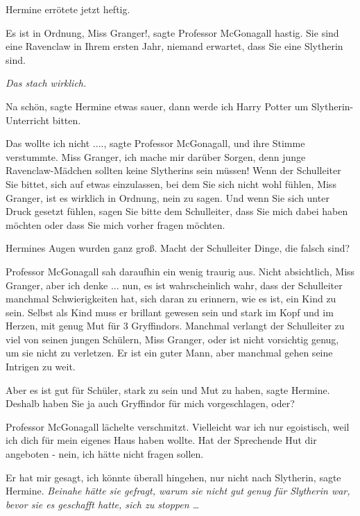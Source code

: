Hermine errötete jetzt heftig.

\glqq{}Es ist in Ordnung, Miss Granger!\grqq{}, sagte Professor McGonagall
hastig. \glqq{}Sie sind eine Ravenclaw in Ihrem ersten Jahr, niemand erwartet,
dass Sie eine Slytherin sind.\grqq{}

\emph{Das stach wirklich.}

\glqq{}Na schön\grqq{}, sagte Hermine etwas sauer, \glqq{}dann werde ich Harry
Potter um Slytherin-Unterricht bitten.\grqq{}

\glqq{}Das wollte ich nicht ....\grqq{}, sagte Professor McGonagall, und ihre
Stimme verstummte. \glqq{}Miss Granger, ich mache mir darüber Sorgen, denn junge
Ravenclaw-Mädchen sollten keine Slytherins sein müssen! Wenn der Schulleiter Sie
bittet, sich auf etwas einzulassen, bei dem Sie sich nicht wohl fühlen, Miss
Granger, ist es wirklich in Ordnung, nein zu sagen. Und wenn Sie sich unter
Druck gesetzt fühlen, sagen Sie bitte dem Schulleiter, dass Sie mich dabei haben
möchten oder dass Sie mich vorher fragen möchten.\grqq{}

Hermines Augen wurden ganz groß. \glqq{}Macht der Schulleiter Dinge, die falsch
sind?\grqq{}

Professor McGonagall sah daraufhin ein wenig traurig aus. \glqq{}Nicht
absichtlich, Miss Granger, aber ich denke ... nun, es ist wahrscheinlich wahr,
dass der Schulleiter manchmal Schwierigkeiten hat, sich daran zu erinnern, wie
es ist, ein Kind zu sein. Selbst als Kind muss er brillant gewesen sein und
stark im Kopf und im Herzen, mit genug Mut für 3 Gryffindors. Manchmal verlangt
der Schulleiter zu viel von seinen jungen Schülern, Miss Granger, oder ist nicht
vorsichtig genug, um sie nicht zu verletzen. Er ist ein guter Mann, aber
manchmal gehen seine Intrigen zu weit.\grqq{}

\glqq{}Aber es ist gut für Schüler, stark zu sein und Mut zu haben\grqq{}, sagte
Hermine. \glqq{}Deshalb haben Sie ja auch Gryffindor für mich vorgeschlagen,
oder?\grqq{}

Professor McGonagall lächelte verschmitzt. \glqq{}Vielleicht war ich nur
egoistisch, weil ich dich für mein eigenes Haus haben wollte. Hat der Sprechende
Hut dir angeboten - nein, ich hätte nicht fragen sollen.\grqq{}

\glqq{}Er hat mir gesagt, ich könnte überall hingehen, nur nicht nach
Slytherin\grqq{}, sagte Hermine.
\emph{Beinahe hätte sie gefragt, warum sie nicht gut genug für Slytherin war,
bevor sie es geschafft hatte, sich zu stoppen …}


